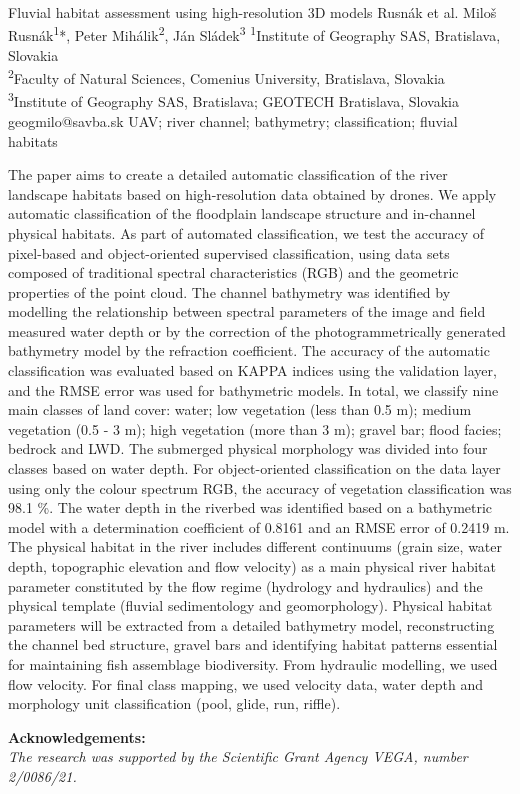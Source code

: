 \abstract
{Fluvial habitat assessment using high-resolution 3D models} %
{Rusnák et al.} %
{Miloš Rusnák\textsuperscript{1}*, Peter Mihálik\textsuperscript{2}, Ján Sládek\textsuperscript{3}} %
{\TLtag} %
{
\textsuperscript{1}Institute of Geography SAS, Bratislava, Slovakia\\
\textsuperscript{2}Faculty of Natural Sciences, Comenius University, Bratislava, Slovakia\\
\textsuperscript{3}Institute of Geography SAS, Bratislava; GEOTECH Bratislava, Slovakia
} %
{geogmilo@savba.sk}  %
{UAV; river channel; bathymetry; classification; fluvial habitats}%
{The paper aims to create a detailed automatic classification of the river landscape habitats based on high-resolution data obtained by drones. We apply automatic classification of the floodplain landscape structure and in-channel physical habitats. As part of automated classification, we test the accuracy of pixel-based and object-oriented supervised classification, using data sets composed of traditional spectral characteristics (RGB) and the geometric properties of the point cloud. The channel bathymetry was identified by modelling the relationship between spectral parameters of the image and field measured water depth or by the correction of the photogrammetrically generated bathymetry model by the refraction coefficient. The accuracy of the automatic classification was evaluated based on KAPPA indices using the validation layer, and the RMSE error was used for bathymetric models. In total, we classify nine main classes of land cover: water; low vegetation (less than 0.5 m); medium vegetation (0.5 - 3 m); high vegetation (more than 3 m); gravel bar; flood facies; bedrock and LWD. The submerged physical morphology was divided into four classes based on water depth. For object-oriented classification on the data layer using only the colour spectrum RGB, the accuracy of vegetation classification was 98.1 \%. The water depth in the riverbed was identified based on a bathymetric model with a determination coefficient of 0.8161 and an RMSE error of 0.2419 m. The physical habitat in the river includes different continuums (grain size, water depth, topographic elevation and flow velocity) as a main physical river habitat parameter constituted by the flow regime (hydrology and hydraulics) and the physical template (fluvial sedimentology and geomorphology). Physical habitat parameters will be extracted from a detailed bathymetry model, reconstructing the channel bed structure, gravel bars and identifying habitat patterns essential for maintaining fish assemblage biodiversity. From hydraulic modelling, we used flow velocity. For final class mapping, we used velocity data, water depth and morphology unit classification (pool, glide, run, riffle).
	
\vspace{0.5em}
\noindent
\textbf{Acknowledgements:}\\
\textit{The research was supported by the Scientific Grant Agency VEGA, number 2/0086/21.}
}%
{}%


